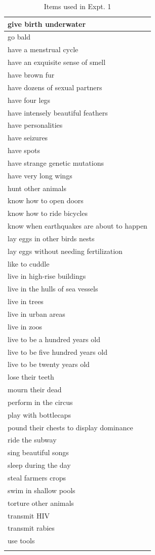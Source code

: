 \documentclass[floatsintext,doc]{apa6}
\begin{document}
\begin{longtable}{ |p{3in}|}
   \hline
give birth underwater \\ 
   \hline
go bald \\ 
   \hline
have a menstrual cycle \\ 
   \hline
have an exquisite sense of smell \\ 
   \hline
have brown fur \\ 
   \hline
have dozens of sexual partners \\ 
   \hline
have four legs \\ 
   \hline
have intensely beautiful feathers \\ 
   \hline
have personalities \\ 
   \hline
have seizures \\ 
   \hline
have spots \\ 
   \hline
have strange genetic mutations \\ 
   \hline
have very long wings \\ 
   \hline
hunt other animals \\ 
   \hline
know how to open doors \\ 
   \hline
know how to ride bicycles \\ 
   \hline
know when earthquakes are about to happen \\ 
   \hline
lay eggs in other birds nests \\ 
   \hline
lay eggs without needing fertilization \\ 
   \hline
like to cuddle \\ 
   \hline
live in high-rise buildings \\ 
   \hline
live in the hulls of sea vessels \\ 
   \hline
live in trees \\ 
   \hline
live in urban areas \\ 
   \hline
live in zoos \\ 
   \hline
live to be a hundred years old \\ 
   \hline
live to be five hundred years old \\ 
   \hline
live to be twenty years old \\ 
   \hline
lose their teeth \\ 
   \hline
mourn their dead \\ 
   \hline
perform in the circus \\ 
   \hline
play with bottlecaps \\ 
   \hline
pound their chests to display dominance \\ 
   \hline
ride the subway \\ 
   \hline
sing beautiful songs \\ 
   \hline
sleep during the day \\ 
   \hline
steal farmers crops \\ 
   \hline
swim in shallow pools \\ 
   \hline
torture other animals \\ 
   \hline
transmit HIV \\ 
   \hline
transmit rabies \\ 
   \hline
use tools \\ 
   \hline
\hline
\caption{Items used in Expt. 1} 
\end{longtable}
\end{document}
